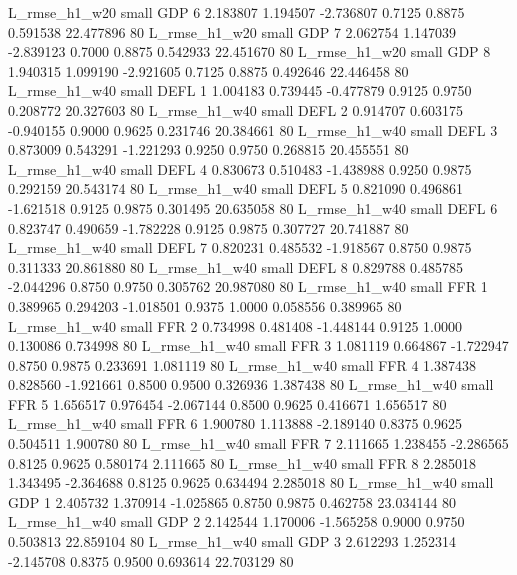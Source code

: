  L_rmse_h1_w20      small      GDP                 6 2.183807 1.194507 -2.736807 0.7125 0.8875  0.591538   22.477896 80
 L_rmse_h1_w20      small      GDP                 7 2.062754 1.147039 -2.839123 0.7000 0.8875  0.542933   22.451670 80
 L_rmse_h1_w20      small      GDP                 8 1.940315 1.099190 -2.921605 0.7125 0.8875  0.492646   22.446458 80
 L_rmse_h1_w40      small     DEFL                 1 1.004183 0.739445 -0.477879 0.9125 0.9750  0.208772   20.327603 80
 L_rmse_h1_w40      small     DEFL                 2 0.914707 0.603175 -0.940155 0.9000 0.9625  0.231746   20.384661 80
 L_rmse_h1_w40      small     DEFL                 3 0.873009 0.543291 -1.221293 0.9250 0.9750  0.268815   20.455551 80
 L_rmse_h1_w40      small     DEFL                 4 0.830673 0.510483 -1.438988 0.9250 0.9875  0.292159   20.543174 80
 L_rmse_h1_w40      small     DEFL                 5 0.821090 0.496861 -1.621518 0.9125 0.9875  0.301495   20.635058 80
 L_rmse_h1_w40      small     DEFL                 6 0.823747 0.490659 -1.782228 0.9125 0.9875  0.307727   20.741887 80
 L_rmse_h1_w40      small     DEFL                 7 0.820231 0.485532 -1.918567 0.8750 0.9875  0.311333   20.861880 80
 L_rmse_h1_w40      small     DEFL                 8 0.829788 0.485785 -2.044296 0.8750 0.9750  0.305762   20.987080 80
 L_rmse_h1_w40      small      FFR                 1 0.389965 0.294203 -1.018501 0.9375 1.0000  0.058556    0.389965 80
 L_rmse_h1_w40      small      FFR                 2 0.734998 0.481408 -1.448144 0.9125 1.0000  0.130086    0.734998 80
 L_rmse_h1_w40      small      FFR                 3 1.081119 0.664867 -1.722947 0.8750 0.9875  0.233691    1.081119 80
 L_rmse_h1_w40      small      FFR                 4 1.387438 0.828560 -1.921661 0.8500 0.9500  0.326936    1.387438 80
 L_rmse_h1_w40      small      FFR                 5 1.656517 0.976454 -2.067144 0.8500 0.9625  0.416671    1.656517 80
 L_rmse_h1_w40      small      FFR                 6 1.900780 1.113888 -2.189140 0.8375 0.9625  0.504511    1.900780 80
 L_rmse_h1_w40      small      FFR                 7 2.111665 1.238455 -2.286565 0.8125 0.9625  0.580174    2.111665 80
 L_rmse_h1_w40      small      FFR                 8 2.285018 1.343495 -2.364688 0.8125 0.9625  0.634494    2.285018 80
 L_rmse_h1_w40      small      GDP                 1 2.405732 1.370914 -1.025865 0.8750 0.9875  0.462758   23.034144 80
 L_rmse_h1_w40      small      GDP                 2 2.142544 1.170006 -1.565258 0.9000 0.9750  0.503813   22.859104 80
 L_rmse_h1_w40      small      GDP                 3 2.612293 1.252314 -2.145708 0.8375 0.9500  0.693614   22.703129 80
